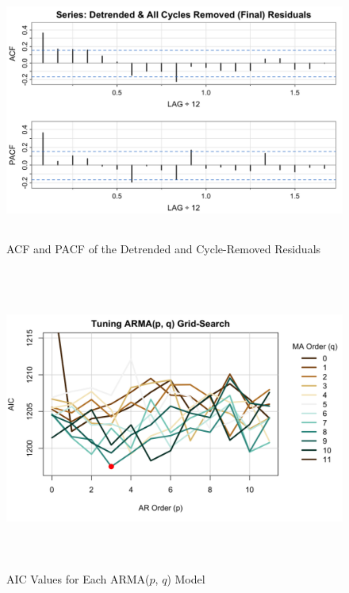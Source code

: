 \documentclass[10pt]{article}
\begin{document}
\begin{figure}[ht!]
    \centering
    \includegraphics[height=85mm, width=115mm]{acf_pacf_final.png}
    \caption{ACF and PACF of the Detrended and Cycle-Removed Residuals}
\end{figure}

\begin{figure}[ht!]
    \centering
    \includegraphics[height=100mm, width=125mm]{tuning.png}
    \caption{AIC Values for Each ARMA($p$, $q$) Model}
\end{figure}
\end{document}
